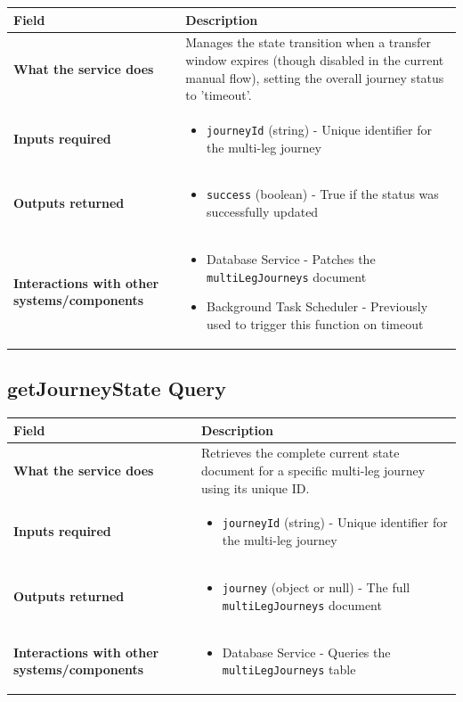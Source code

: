 \documentclass[11pt,a4paper]{article}
\begin{document}
\begin{longtable}{|p{4cm}|p{12cm}|}
\hline
\textbf{Field} & \textbf{Description} \\
\hline
\textbf{What the service does} & 
Manages the state transition when a transfer window expires (though disabled in the current manual flow), setting the overall journey status to 'timeout'. \\
\hline
\textbf{Inputs required} & 
\begin{itemize}[nosep]
\item \texttt{journeyId} (string) - Unique identifier for the multi-leg journey
\end{itemize} \\
\hline
\textbf{Outputs returned} & 
\begin{itemize}[nosep]
\item \texttt{success} (boolean) - True if the status was successfully updated
\end{itemize} \\
\hline
\textbf{Interactions with other systems/components} & 
\begin{itemize}[nosep]
\item Database Service - Patches the \texttt{multiLegJourneys} document
\item Background Task Scheduler - Previously used to trigger this function on timeout
\end{itemize} \\
\hline
\end{longtable}

\subsection{getJourneyState Query}

\begin{longtable}{|p{4cm}|p{12cm}|}
\hline
\textbf{Field} & \textbf{Description} \\
\hline
\textbf{What the service does} & 
Retrieves the complete current state document for a specific multi-leg journey using its unique ID. \\
\hline
\textbf{Inputs required} & 
\begin{itemize}[nosep]
\item \texttt{journeyId} (string) - Unique identifier for the multi-leg journey
\end{itemize} \\
\hline
\textbf{Outputs returned} & 
\begin{itemize}[nosep]
\item \texttt{journey} (object or null) - The full \texttt{multiLegJourneys} document
\end{itemize} \\
\hline
\textbf{Interactions with other systems/components} & 
\begin{itemize}[nosep]
\item Database Service - Queries the \texttt{multiLegJourneys} table
\end{itemize} \\
\hline
\end{longtable}
\end{document}
